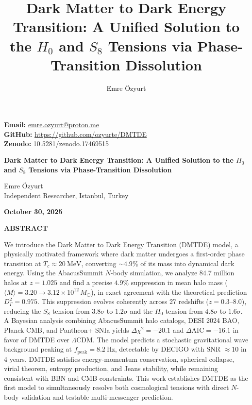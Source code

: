 \documentclass[aps,prd,twocolumn,superscriptaddress,nofootinbib,floatfix,preprintnumbers]{revtex4-2}
\newcommand{\DMTDE}{\textsc{DMTDE}\xspace}
\newcommand{\LCDM}{\ensuremath{\Lambda\text{CDM}}\xspace}
\newcommand{\Msun}{\ensuremath{M_\odot}\xspace}
\begin{document}
\onecolumngrid

\begin{center}
\textbf{Email:} \url{emre.ozyurt@proton.me} \\
\textbf{GitHub:} \url{https://github.com/ozyurte/DMTDE} \\
\textbf{Zenodo:} 10.5281/zenodo.17469515
\end{center}

\title{Dark Matter to Dark Energy Transition: A Unified Solution to the $H_0$ and $S_8$ Tensions via Phase-Transition Dissolution}

\author{Emre \"{O}zyurt}


\twocolumngrid  %
\onecolumngrid  %

\begin{center}
{\bfseries\LARGE Dark Matter to Dark Energy Transition: A Unified Solution to the $H_0$ and $S_8$ Tensions via Phase-Transition Dissolution \par}
\vspace{1em}

{\large Emre \"{O}zyurt}\\
Independent Researcher, Istanbul, Turkey\\
\begin{center}
\textbf{October 30, 2025}
\end{center}

\vspace{1.5em}
{\bfseries ABSTRACT}
\end{center}

\noindent
We introduce the Dark Matter to Dark Energy Transition (\DMTDE) model, a physically motivated framework where dark matter undergoes a first-order phase transition at $T_c \approx \SI{20}{\MeV}$, converting $\sim 4.9\%$ of its mass into dynamical dark energy. Using the AbacusSummit $N$-body simulation, we analyze 84.7 million halos at $z = 1.025$ and find a precise $4.9\%$ suppression in mean halo mass ($\langle M \rangle = 3.20 \to 3.12 \times 10^{12}\,\Msun$), in exact agreement with the theoretical prediction $D_\Gamma^2 = 0.975$. This suppression evolves coherently across 27 redshifts ($z=0.3$--$8.0$), reducing the $S_8$ tension from $3.8\sigma$ to $1.2\sigma$ and the $H_0$ tension from $4.8\sigma$ to $1.6\sigma$. A Bayesian analysis combining AbacusSummit halo catalogs, DESI 2024 BAO, Planck CMB, and Pantheon+ SNIa yields $\Delta \chi^2 = -20.1$ and $\Delta \mathrm{AIC} = -16.1$ in favor of \DMTDE over \LCDM. The model predicts a stochastic gravitational wave background peaking at $f_{\mathrm{peak}} = \SI{8.2}{\hertz}$, detectable by DECIGO with SNR $\approx 10$ in 4 years. \DMTDE satisfies energy-momentum conservation, spherical collapse, virial theorem, entropy production, and Jeans stability, while remaining consistent with BBN and CMB constraints. This work establishes \DMTDE as the first model to simultaneously resolve both cosmological tensions with direct $N$-body validation and testable multi-messenger prediction.
\end{document}

